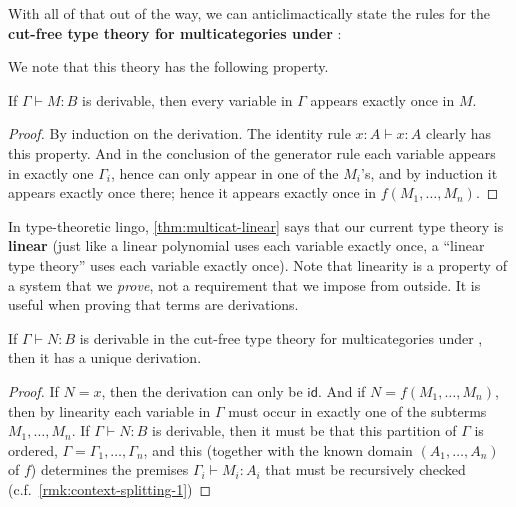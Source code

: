 \documentclass{book}
\def\idfunc{\mathsf{id}}
\let\types\vdash
\begin{document}
With all of that out of the way, we can anticlimactically state the rules for the \textbf{cut-free type theory for multicategories under \cG}:
We note that this theory has the following property.

\begin{lem}\label{thm:multicat-linear}
  If $\Gamma\types M:B$ is derivable, then every variable in $\Gamma$ appears exactly once in $M$.
\end{lem}
\begin{proof}
  By induction on the derivation.
  The identity rule $x:A\types x:A$ clearly has this property.
  And in the conclusion of the generator rule each variable appears in exactly one $\Gamma_i$, hence can only appear in one of the $M_i$'s, and by induction it appears exactly once there; hence it appears exactly once in $f(M_1,\dots,M_n)$.
\end{proof}

In type-theoretic lingo, \cref{thm:multicat-linear} says that our current type theory is \textbf{linear} (just like a linear polynomial uses each variable exactly once, a ``linear type theory'' uses each variable exactly once).
Note that linearity is a property of a system that we \emph{prove}, not a requirement that we impose from outside.
It is useful when proving that terms are derivations.

\begin{lem}\label{thm:multicat-tad}
  If $\Gamma\types N:B$ is derivable in the cut-free type theory for multicategories under \cG, then it has a unique derivation.
\end{lem}
\begin{proof}
  If $N=x$, then the derivation can only be $\idfunc$.
  And if $N=f(M_1,\dots,M_n)$, then by linearity each variable in $\Gamma$ must occur in exactly one of the subterms $M_1,\dots,M_n$.
  If $\Gamma\types N:B$ is derivable, then it must be that this partition of $\Gamma$ is ordered, $\Gamma=\Gamma_1,\dots,\Gamma_n$, and this (together with the known domain $(A_1,\dots,A_n)$ of $f$) determines the premises $\Gamma_i \types M_i:A_i$ that must be recursively checked (c.f.\ \cref{rmk:context-splitting-1})
\end{proof}
\end{document}
